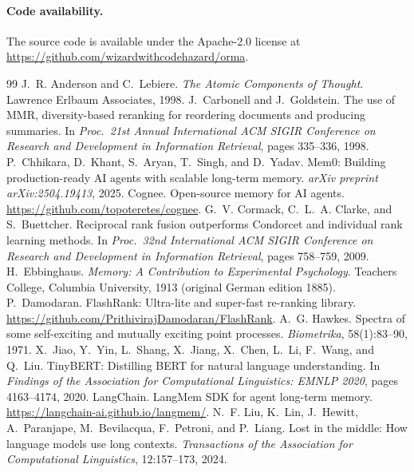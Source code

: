 \documentclass[11pt]{article}
\begin{document}
\paragraph{Code availability.}
The source code is available under the Apache-2.0 license at \url{https://github.com/wizardwithcodehazard/orma}.

\begin{thebibliography}{99}
 J.~R. Anderson and C.~Lebiere. \emph{The Atomic Components of Thought}. Lawrence Erlbaum Associates, 1998.
 J.~Carbonell and J.~Goldstein. The use of MMR, diversity-based reranking for reordering documents and producing summaries. In \emph{Proc.\ 21st Annual International ACM SIGIR Conference on Research and Development in Information Retrieval}, pages 335--336, 1998.
 P.~Chhikara, D.~Khant, S.~Aryan, T.~Singh, and D.~Yadav. Mem0: Building production-ready AI agents with scalable long-term memory. \emph{arXiv preprint arXiv:2504.19413}, 2025.
 Cognee. Open-source memory for AI agents. \url{https://github.com/topoteretes/cognee}.
 G.~V. Cormack, C.~L.~A. Clarke, and S.~Buettcher. Reciprocal rank fusion outperforms Condorcet and individual rank learning methods. In \emph{Proc.\ 32nd International ACM SIGIR Conference on Research and Development in Information Retrieval}, pages 758--759, 2009.
 H.~Ebbinghaus. \emph{Memory: A Contribution to Experimental Psychology}. Teachers College, Columbia University, 1913 (original German edition 1885).
 P.~Damodaran. FlashRank: Ultra-lite and super-fast re-ranking library. \url{https://github.com/PrithivirajDamodaran/FlashRank}.
 A.~G. Hawkes. Spectra of some self-exciting and mutually exciting point processes. \emph{Biometrika}, 58(1):83--90, 1971.
 X.~Jiao, Y.~Yin, L.~Shang, X.~Jiang, X.~Chen, L.~Li, F.~Wang, and Q.~Liu. TinyBERT: Distilling BERT for natural language understanding. In \emph{Findings of the Association for Computational Linguistics: EMNLP 2020}, pages 4163--4174, 2020.
 LangChain. LangMem SDK for agent long-term memory. \url{https://langchain-ai.github.io/langmem/}.
 N.~F. Liu, K.~Lin, J.~Hewitt, A.~Paranjape, M.~Bevilacqua, F.~Petroni, and P.~Liang. Lost in the middle: How language models use long contexts. \emph{Transactions of the Association for Computational Linguistics}, 12:157--173, 2024.

\end{thebibliography}
\end{document}
